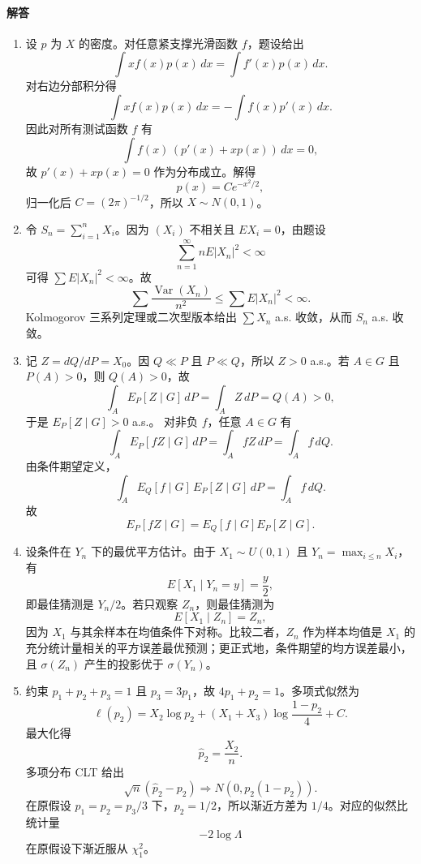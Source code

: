 \documentclass[UTF8,12pt]{ctexart}
\begin{document}
\paragraph{解答}
\begin{enumerate}[label=\textbf{\arabic*.},leftmargin=2.2em]
\item 设 \(p\) 为 \(X\) 的密度。对任意紧支撑光滑函数 \(f\)，题设给出
\[
\int x f(x)p(x)\,dx=\int f'(x)p(x)\,dx.
\]
对右边分部积分得
\[
\int x f(x)p(x)\,dx=-\int f(x)p'(x)\,dx.
\]
因此对所有测试函数 \(f\) 有
\[
\int f(x)\,(p'(x)+xp(x))\,dx=0,
\]
故 \(p'(x)+xp(x)=0\) 作为分布成立。解得
\[
p(x)=Ce^{-x^2/2},
\]
归一化后 \(C=(2\pi)^{-1/2}\)，所以 \(X\sim N(0,1)\)。

\item 令 \(S_n=\sum_{i=1}^n X_i\)。因为 \((X_i)\) 不相关且 \(E X_i=0\)，由题设
\[
\sum_{n=1}^\infty nE|X_n|^2<\infty
\]
可得 \(\sum E|X_n|^2<\infty\)。故
\[
\sum \frac{\operatorname{Var}(X_n)}{n^2}\le \sum E|X_n|^2<\infty.
\]
Kolmogorov 三系列定理或二次型版本给出 \(\sum X_n\) a.s. 收敛，从而 \(S_n\) a.s. 收敛。

\item 记 \(Z=dQ/dP=X_0\)。因 \(Q\ll P\) 且 \(P\ll Q\)，所以 \(Z>0\) a.s.。若 \(A\in G\) 且 \(P(A)>0\)，则 \(Q(A)>0\)，故
\[
\int_A E_P[Z\mid G]\,dP=\int_A Z\,dP=Q(A)>0,
\]
于是 \(E_P[Z\mid G]>0\) a.s.。
对非负 \(f\)，任意 \(A\in G\) 有
\[
\int_A E_P[fZ\mid G]\,dP=\int_A fZ\,dP=\int_A f\,dQ.
\]
由条件期望定义，
\[
\int_A E_Q[f\mid G]\,E_P[Z\mid G]\,dP=\int_A f\,dQ.
\]
故
\[
E_P[fZ\mid G]=E_Q[f\mid G]E_P[Z\mid G].
\]

\item 设条件在 \(Y_n\) 下的最优平方估计。由于 \(X_1\sim U(0,1)\) 且 \(Y_n=\max_{i\le n}X_i\)，有
\[
E[X_1\mid Y_n=y]=\frac{y}{2},
\]
即最佳猜测是 \(Y_n/2\)。若只观察 \(Z_n\)，则最佳猜测为
\[
E[X_1\mid Z_n]=Z_n,
\]
因为 \(X_1\) 与其余样本在均值条件下对称。比较二者，\(Z_n\) 作为样本均值是 \(X_1\) 的充分统计量相关的平方误差最优预测；更正式地，条件期望的均方误差最小，且 \(\sigma(Z_n)\) 产生的投影优于 \(\sigma(Y_n)\)。

\item 约束 \(p_1+p_2+p_3=1\) 且 \(p_3=3p_1\)，故 \(4p_1+p_2=1\)。多项式似然为
\[
\ell(p_2)=X_2\log p_2 +(X_1+X_3)\log\frac{1-p_2}{4}+C.
\]
最大化得
\[
\hat p_2=\frac{X_2}{n}.
\]
多项分布 CLT 给出
\[
\sqrt n(\hat p_2-p_2)\Rightarrow N(0,p_2(1-p_2)).
\]
在原假设 \(p_1=p_2=p_3/3\) 下，\(p_2=1/2\)，所以渐近方差为 \(1/4\)。对应的似然比统计量
\[
-2\log\Lambda
\]
在原假设下渐近服从 \(\chi^2_1\)。
\end{enumerate}
\end{document}
